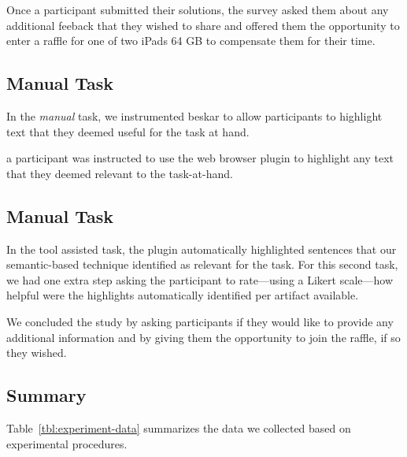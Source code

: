 Once a participant submitted their solutions, the survey
asked them about any additional feeback that they wished to share and 
offered them the opportunity to enter a raffle for one of two iPads 64 GB 
to compensate them for their time.



\subsection{Manual Task}
\label{cp6:procedures-manual}



In the \textit{manual} task, we instrumented \acs{beskar} to allow participants to highlight text that they deemed useful for the task at hand. 





a participant was instructed to use the web browser plugin to highlight any text that they deemed relevant to the task-at-hand. 

\subsection{Manual Task}
\label{cp6:procedures-tool-assisted}


In the tool assisted task, the plugin automatically highlighted sentences that our semantic-based technique identified as relevant for the task. 
For this second task, we had one extra step asking the participant to rate---using a Likert scale---how helpful were the highlights automatically identified per artifact available. 


We concluded the study by asking participants if they would like to provide any additional information and 
by giving them the opportunity to join the raffle, if so they wished. 



\subsection{Summary}



Table~\ref{tbl:experiment-data} summarizes the data we collected based on experimental procedures.


